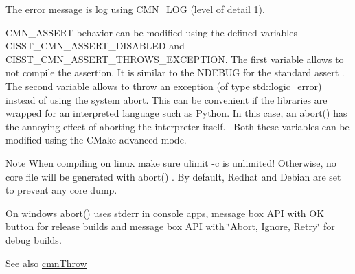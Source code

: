\begin{DoxyItemize}
\item The error message is log using \hyperlink{cmn_logger_8h_a2eb3b40558ec17c9ae45197777aca7b2}{C\+M\+N\+\_\+\+L\+O\+G} (level of detail 1).\end{DoxyItemize}
\begin{DoxyItemize}
\item C\+M\+N\+\_\+\+A\+S\+S\+E\+R\+T behavior can be modified using the defined variables C\+I\+S\+S\+T\+\_\+\+C\+M\+N\+\_\+\+A\+S\+S\+E\+R\+T\+\_\+\+D\+I\+S\+A\+B\+L\+E\+D and C\+I\+S\+S\+T\+\_\+\+C\+M\+N\+\_\+\+A\+S\+S\+E\+R\+T\+\_\+\+T\+H\+R\+O\+W\+S\+\_\+\+E\+X\+C\+E\+P\+T\+I\+O\+N. The first variable allows to not compile the assertion. It is similar to the {\ttfamily N\+D\+E\+B\+U\+G} for the standard {\ttfamily assert} .~\newline
The second variable allows to throw an exception (of type {\ttfamily std\+::logic\+\_\+error}) instead of using the system {\ttfamily abort}. This can be convenient if the libraries are wrapped for an interpreted language such as Python. In this case, an {\ttfamily abort()} has the annoying effect of aborting the interpreter itself.~\newline
Both these variables can be modified using the C\+Make advanced mode.\end{DoxyItemize}
\begin{DoxyNote}{Note}
When compiling on linux make sure ulimit -\/c is unlimited! Otherwise, no core file will be generated with {\ttfamily abort()} . By default, Redhat and Debian are set to prevent any core dump.

On windows {\ttfamily abort()} uses stderr in console apps, message box A\+P\+I with O\+K button for release builds and message box A\+P\+I with \char`\"{}\+Abort, Ignore, Retry\char`\"{} for debug builds.
\end{DoxyNote}
\begin{DoxySeeAlso}{See also}
\hyperlink{cmn_throw_8h_a6fe29a0b6f112fe0032896bb904f8377}{cmn\+Throw} 
\end{DoxySeeAlso}


